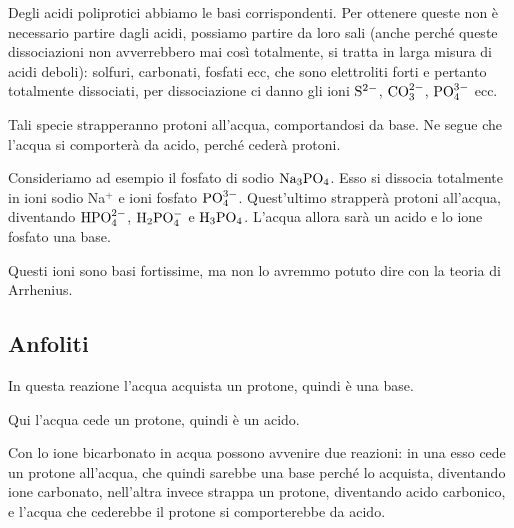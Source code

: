 Degli acidi poliprotici abbiamo le basi corrispondenti. Per ottenere queste non è necessario partire dagli acidi, possiamo partire da loro sali (anche perché queste dissociazioni non avverrebbero mai così totalmente, si tratta in larga misura di acidi deboli): solfuri, carbonati, fosfati ecc, che sono elettroliti forti e pertanto totalmente dissociati, per dissociazione ci danno gli ioni $\rm S^{2-}$, $\rm CO_3^{2-}$, $\rm PO_4^{3-}$ ecc.

Tali specie strapperanno protoni all'acqua, comportandosi da base. Ne segue che l'acqua si comporterà da acido, perché cederà protoni.

\vspace{0.2cm}Consideriamo ad esempio il fosfato di sodio $\rm Na_3PO_4$. Esso si dissocia totalmente in ioni sodio Na$^+$ e ioni fosfato $\rm PO_4^{3-}$. Quest'ultimo strapperà protoni all'acqua, diventando $\rm HPO_4^{2-}$, $\rm H_2PO_4^-$ e $\rm H_3PO_4$. L'acqua allora sarà un acido e lo ione fosfato una base.

Questi ioni sono basi fortissime, ma non lo avremmo potuto dire con la teoria di Arrhenius.
\subsection{Anfoliti}


\vspace{0.2cm}In questa reazione l'acqua acquista un protone, quindi è una base.

\vspace{0.2cm}

\vspace{0.2cm}Qui l'acqua cede un protone, quindi è un acido.

\vspace{0.2cm}

\vspace{0.2cm}

\vspace{0.2cm}Con lo ione bicarbonato in acqua possono avvenire due reazioni: in una esso cede un protone all'acqua, che quindi sarebbe una base perché lo acquista, diventando ione carbonato, nell'altra invece strappa un protone, diventando acido carbonico, e l'acqua che cederebbe il protone si comporterebbe da acido.

